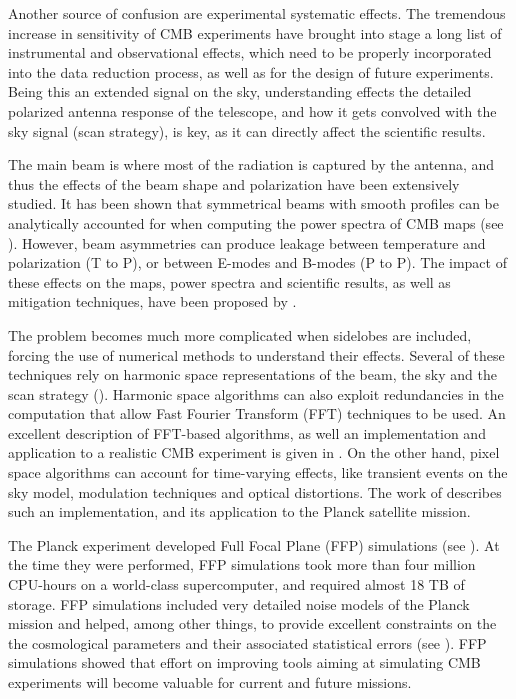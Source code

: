 \documentclass[a4paper,11pt]{article}
\begin{document}
Another source of confusion are experimental systematic effects. The tremendous increase in sensitivity of CMB experiments have brought into stage a long list of instrumental and observational effects, which need to be properly incorporated into the data reduction process, as well as for the design of future experiments. Being this an extended signal on the sky, understanding effects the detailed polarized antenna response of the telescope, and how it gets convolved with the sky signal (scan strategy), is key, as it can directly affect the scientific results.

The main beam is where most of the radiation is captured by the antenna, and thus the effects of the beam shape and polarization have been extensively studied. 
It has been shown that symmetrical beams with smooth profiles can be analytically accounted for when computing the power spectra of CMB maps (see \cite{2003ApJS..148...39P}).
However, beam asymmetries can produce leakage between temperature and polarization (T to P), or between E-modes and B-modes (P to P). The impact of these effects on the maps, power spectra and scientific results, as well as mitigation techniques, have been proposed by \cite{PhysRevD.77.083003, 2007MNRAS.376.1767O, 2015JCAP...03..048D}.

The problem becomes much more complicated when sidelobes are included, forcing the use of numerical methods to understand their effects.
Several of these techniques rely on harmonic space representations of the beam, the sky and the scan strategy (\cite{2001PhRvD..63l3002W,2000PhRvD..62l3002C}). Harmonic space algorithms can also exploit redundancies in the computation that allow Fast Fourier Transform (FFT) techniques to be used. An excellent description of FFT-based algorithms, as well an implementation and application to a realistic CMB experiment is given in \cite{2018arXiv180905034D}. On the other hand, pixel space algorithms can account for time-varying effects, like transient events on the sky model, modulation techniques and optical distortions. The work of \cite{2011ApJS..193....5M} describes such an implementation, and its application to the Planck satellite mission.

The Planck experiment developed Full Focal Plane (FFP) simulations (see \cite{2016A&A...594A..12P}). At the time they were performed, FFP simulations took more than four million CPU-hours on a world-class supercomputer, and required almost 18 TB of storage. FFP simulations included very detailed noise models of the Planck mission and helped, among other things, to provide excellent constraints on the the cosmological parameters and their associated statistical errors (see \cite{2016A&A...594A..13P}). FFP simulations showed that effort on improving tools aiming at simulating CMB experiments will become valuable for current and future missions.
\end{document}
